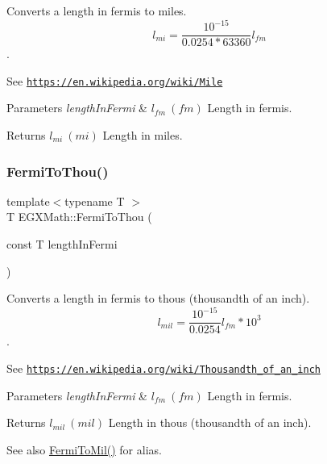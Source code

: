 Converts a length in fermis to miles. \[ l_{mi}=\frac{10^{-15}}{0.0254 * 63360} l_{fm} \]. 

See \href{https://en.wikipedia.org/wiki/Mile}{\tt https\+://en.\+wikipedia.\+org/wiki/\+Mile} 
\begin{DoxyParams}{Parameters}
{\em length\+In\+Fermi} & $ l_{fm}\ (fm)$ Length in fermis. \\
\hline
\end{DoxyParams}
\begin{DoxyReturn}{Returns}
$ l_{mi}\ (mi)$ Length in miles. 
\end{DoxyReturn}
\mbox{\label{group___e_g_x_math-_conversions-_length_conversions-_non-_s_i-_fermi-_imperial_ga370507ab066f38bc761a2ecd2b55c670}} 
\subsubsection{\texorpdfstring{Fermi\+To\+Thou()}{FermiToThou()}}
{\footnotesize\ttfamily template$<$typename T $>$ \\
T E\+G\+X\+Math\+::\+Fermi\+To\+Thou (\begin{DoxyParamCaption}\item[{const T}]{length\+In\+Fermi }\end{DoxyParamCaption})}



Converts a length in fermis to thous (thousandth of an inch). \[ l_{mil}= \frac{10^{-15}}{0.0254} l_{fm} * 10^{3} \]. 

See \href{https://en.wikipedia.org/wiki/Thousandth_of_an_inch}{\tt https\+://en.\+wikipedia.\+org/wiki/\+Thousandth\+\_\+of\+\_\+an\+\_\+inch} 
\begin{DoxyParams}{Parameters}
{\em length\+In\+Fermi} & $ l_{fm}\ (fm)$ Length in fermis. \\
\hline
\end{DoxyParams}
\begin{DoxyReturn}{Returns}
$ l_{mil}\ (mil)$ Length in thous (thousandth of an inch). 
\end{DoxyReturn}
\begin{DoxySeeAlso}{See also}
\mbox{\hyperlink{group___e_g_x_math-_conversions-_length_conversions-_non-_s_i-_fermi-_imperial_ga8559f43da08dbb3b2e09fab322904953}{Fermi\+To\+Mil()}} for alias. 
\end{DoxySeeAlso}
\mbox{\label{group___e_g_x_math-_conversions-_length_conversions-_non-_s_i-_fermi-_imperial_ga5dce34089b9de102570c5c9c68b58176}} 
